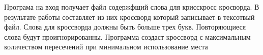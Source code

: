 \label{index_md_README}%
%
 Програма на вход получает файл содержфщий слова для крисскросс кросворда. В результате работы составляет из них кроссворд который записывает в тексотвый файл. Слова для кроссворда должны быть больше трех букв. Повторяющиеся слова будут проигнорированны. Программа создаст кроссворд с максимальным количеством пересечений при минимальном использование места 